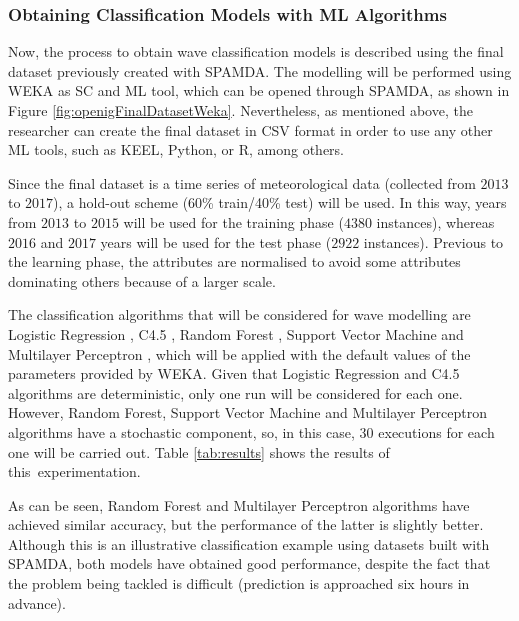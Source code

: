\documentclass[energies,article,accept,moreauthors,pdftex]{Definitions/mdpi}
\begin{document}
\begin{paracol}{2}
\switchcolumn
\vspace{-12pt}

		\subsubsection{Obtaining Classification Models with ML Algorithms}
		
			Now, the process to obtain wave classification models is described using the final dataset previously created with SPAMDA. The modelling will be performed using WEKA as SC and ML tool, which can be opened through SPAMDA, as shown in Figure \ref{fig:openigFinalDatasetWeka}. Nevertheless, as mentioned above, the researcher can create the final dataset in CSV format in order to use any other ML tools, such as KEEL, Python, or R, among others.
			
			
			
			Since the final dataset is a time series of meteorological data (collected from $2013$ to $2017$), a hold-out scheme (60\% train/40\% test) will be used. In this way, years from $2013$ to $2015$ will be used for the training phase ($4380$ instances), whereas $2016$ and $2017$ years will be used for the test phase ($2922$ instances). Previous to the learning phase, the attributes are normalised to avoid some attributes dominating others because of a larger scale.
			
			The classification algorithms that will be considered for wave modelling are Logistic Regression \cite{hosmer2013applied}, C4.5 \cite{quinlan2014c4}, Random Forest \cite{breiman2001random}, Support Vector Machine \cite{cortes1995support} and Multilayer Perceptron \cite{haykin1994neural}, which will be applied with the default values of the parameters provided by WEKA. Given that Logistic Regression and C4.5 algorithms are deterministic, only one run will be considered for each one. However, Random Forest, Support Vector Machine and Multilayer Perceptron algorithms have a stochastic component, so, in this case, 30 executions for each one will be carried out. Table \ref{tab:results} shows the results of \mbox{this experimentation}.
			
				
				
			As can be seen, Random Forest and Multilayer Perceptron algorithms have achieved similar accuracy, but the performance of the latter is slightly better. Although this is an illustrative classification example using datasets built with SPAMDA, both models have obtained good performance, despite the fact that the problem being tackled is difficult (prediction is approached six hours in advance).
			
\clearpage
\end{paracol}
\end{document}
